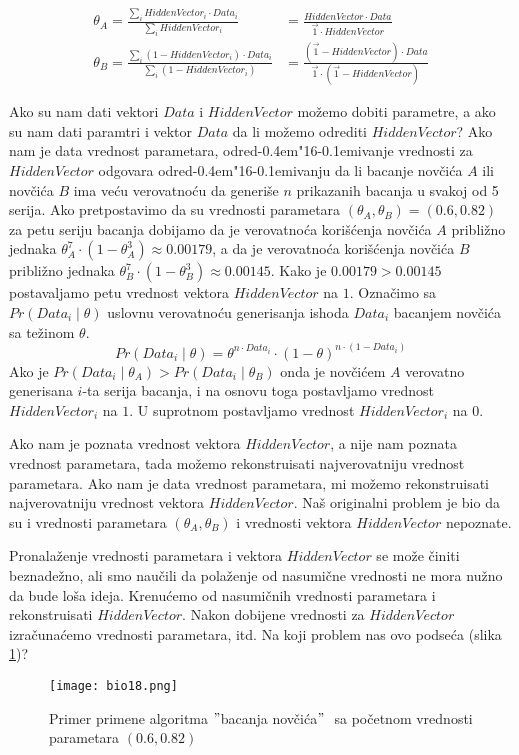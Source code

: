 \documentclass[a4paper]{book}
\def \dj {d\kern-0.4em\char"16\kern-0.1em}
\begin{document}
\begin{equation}
\label{eq2}
\begin{split}
\theta_A = \frac{\sum_i HiddenVector_i \cdot Data_i}{\sum_i HiddenVector_i} & = 
\frac{HiddenVector \cdot Data}{\overrightarrow{1} \cdot HiddenVector} \\
\theta_B = \frac{\sum_i (1-HiddenVector_i) \cdot Data_i}{\sum_i (1-HiddenVector_i)} & =
\frac{(\overrightarrow{1} - HiddenVector) \cdot Data}{\overrightarrow{1} \cdot (\overrightarrow{1} - HiddenVector)}
\end{split}
\end{equation}

Ako su nam dati vektori $Data$ i $HiddenVector$ možemo dobiti parametre, a ako su nam dati paramtri i vektor $Data$ da li možemo odrediti $HiddenVector$? Ako nam je data vrednost parametara, odre\dj ivanje vrednosti za $HiddenVector$ odgovara odre\dj ivanju da li bacanje novčića $A$ ili novčića $B$ ima veću verovatnoću da generiše $n$ prikazanih bacanja u svakoj od 5 serija. Ako pretpostavimo da su vrednosti parametara $(\theta_A,\theta_B) = (0.6,0.82)$ za petu seriju bacanja dobijamo da je verovatnoća korišćenja novčića $A$ približno jednaka $\theta_A^7\cdot(1-\theta_A^3) \approx 0.00179$, a da je verovatnoća korišćenja novčića $B$ približno jednaka $\theta_B^7\cdot(1-\theta_B^3) \approx 0.00145$. Kako je $0.00179 > 0.00145$ postavaljamo petu vrednost vektora $HiddenVector$ na $1$. Označimo sa $Pr(Data_i\mid \theta)$ uslovnu verovatnoću generisanja ishoda $Data_i$ bacanjem novčića sa težinom $\theta$.
$$
Pr(Data_i\mid \theta) = \theta^{n \cdot Data_i}\cdot(1-\theta)^{n \cdot (1-Data_i)}
$$
Ako je $Pr(Data_i\mid \theta_A) > Pr(Data_i\mid \theta_B)$ onda je novčićem $A$ verovatno generisana $i$-ta serija bacanja, i na osnovu toga postavljamo vrednost $HiddenVector_i$ na $1$. U suprotnom postavljamo vrednost $HiddenVector_i$ na $0$.

Ako nam je poznata vrednost vektora $HiddenVector$, a nije nam poznata vrednost parametara, tada možemo rekonstruisati najverovatniju vrednost parametara. Ako nam je data  vrednost parametara, mi možemo rekonstruisati najverovatniju vrednost vektora $HiddenVector$. Naš originalni problem je bio da su i vrednosti parametara $(\theta_A,\theta_B)$ i vrednosti vektora $HiddenVector$ nepoznate. 

Pronalaženje vrednosti parametara i vektora $HiddenVector$ se može činiti beznadežno, ali smo naučili da polaženje od nasumične vrednosti ne mora nužno da bude loša ideja. Krenućemo od nasumičnih vrednosti parametara i rekonstruisati $HiddenVector$. Nakon dobijene vrednosti za $HiddenVector$ izračunaćemo vrednosti parametara, itd. Na koji problem nas ovo podseća (slika \ref{slika 18})? 
\begin{figure}[h!]
    \centering
    \texttt{[image: bio18.png]}
    \caption{Primer primene algoritma$ $ $"$bacanja novčića$"$ $ $ sa početnom vrednosti parametara $(0.6, 0.82)$}
    \label{slika 18}
\end{figure}
\end{document}
